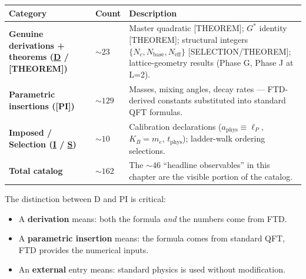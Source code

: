 \documentclass[
  11pt,
  letterpaper,
  twoside,
  openany]{book}
\providecommand{\tightlist}{%
  \setlength{\itemsep}{0pt}\setlength{\parskip}{0pt}}
\newcommand{\Gs}{G^{*}{}}
\begin{document}
\begin{longtable}[]{@{}
  >{\raggedright\arraybackslash}p{}
  >{\raggedright\arraybackslash}p{}
  >{\raggedright\arraybackslash}p{}@{}}
\toprule\noalign{}
\begin{minipage}[b]{\linewidth}\raggedright
Category
\end{minipage} & \begin{minipage}[b]{\linewidth}\raggedright
Count
\end{minipage} & \begin{minipage}[b]{\linewidth}\raggedright
Description
\end{minipage} \\
\midrule\noalign{}
\endhead
\bottomrule\noalign{}
\endlastfoot
\textbf{Genuine derivations + theorems (\hyperref[d]{D} /
{[}THEOREM{]})} & \(\sim 23\) & Master quadratic {[}THEOREM{]}; \(\Gs\)
identity {[}THEOREM{]}; structural integers
\(\{N_c, N_\mathrm{base}, N_\mathrm{eff}\}\) {[}SELECTION/THEOREM{]};
lattice-geometry results (Phase G, Phase J at L=2). \\
\textbf{Parametric insertions ({[}PI{]})} & \(\sim 129\) & Masses,
mixing angles, decay rates --- FTD-derived constants substituted into
standard QFT formulas. \\
\textbf{Imposed / Selection (\hyperref[i]{I} / \hyperref[s]{S})} &
\(\sim 10\) & Calibration declarations
(\(a_\mathrm{phys} \equiv \ell_P\), \(K_B = m_e\), \(t_\mathrm{phys}\));
ladder-walk ordering selections. \\
\textbf{Total catalog} & \(\sim 162\) & The \(\sim 46\) ``headline
observables'' in this chapter are the visible portion of the catalog. \\
\end{longtable}

The distinction between D and PI is critical:

\begin{itemize}
\tightlist
\item
  A \textbf{derivation} means: both the formula \emph{and} the numbers
  come from FTD.
\item
  A \textbf{parametric insertion} means: the formula comes from standard
  QFT, FTD provides the numerical inputs.
\item
  An \textbf{external} entry means: standard physics is used without
  modification.
\end{itemize}
\end{document}
